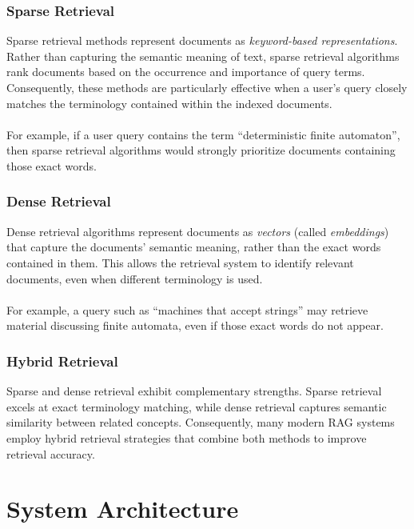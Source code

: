 \documentclass[12pt, a4paper]{report}
\begin{document}
\subsection{Sparse Retrieval}
Sparse retrieval methods represent documents as \textit{keyword-based representations}. Rather than capturing the semantic meaning of text, sparse retrieval algorithms rank documents based on the occurrence and importance of query terms. Consequently, these methods are particularly effective when a user's query closely matches the terminology contained within the indexed documents.~\\~\\
For example, if a user query contains the term ``deterministic finite automaton'', then sparse retrieval algorithms would strongly prioritize documents containing those exact words.
\subsection{Dense Retrieval}
Dense retrieval algorithms represent documents as \textit{vectors} (called \textit{embeddings}) that capture the documents' semantic meaning, rather than the exact words contained in them. This allows the retrieval system to identify relevant documents, even when different terminology is used.~\\~\\
For example, a query such as ``machines that accept strings'' may retrieve material discussing finite automata, even if those exact words do not appear.
\subsection{Hybrid Retrieval}
Sparse and dense retrieval exhibit complementary strengths. Sparse retrieval excels at exact terminology matching, while dense retrieval captures semantic similarity between related concepts. Consequently, many modern RAG systems employ hybrid retrieval strategies that combine both methods to improve retrieval accuracy.
\chapter{System Architecture}
\end{document}
